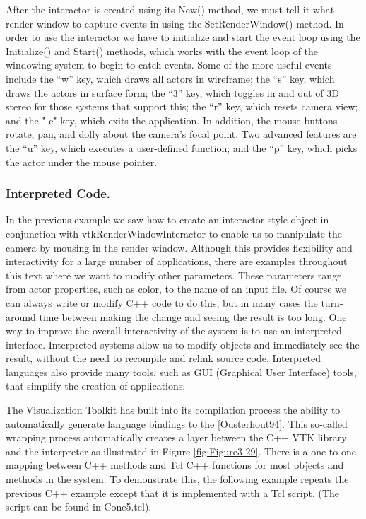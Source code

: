 After the interactor is created using its New() method, we must tell it what render window to capture events in using the SetRenderWindow() method. In order to use the interactor we have to initialize and start the event loop using the Initialize() and Start() methods, which works with the event loop of the windowing system to begin to catch events. Some of the more useful events include the ``w'' key, which draws all actors in wireframe; the ``s'' key, which draws the actors in surface form; the ``3'' key, which toggles in and out of 3D stereo for those systems that support this; the ``r'' key, which resets camera view; and the " e" key, which exits the application. In addition, the mouse buttons rotate, pan, and dolly about the camera's focal point. Two advanced features are the ``u'' key, which executes a user-defined function; and the ``p'' key, which picks the actor under the mouse pointer.

\subsubsection{Interpreted Code.}
\label{pg:ic}
In the previous example we saw how to create an interactor style object in conjunction with vtkRenderWindowInteractor to enable us to manipulate the camera by mousing in the render window. Although this provides flexibility and interactivity for a large number of applications, there are examples throughout this text where we want to modify other parameters. These parameters range from actor properties, such as color, to the name of an input file. Of course we can always write or modify C++ code to do this, but in many cases the turn-around time between making the change and seeing the result is too long. One way to improve the overall interactivity of the system is to use an interpreted interface. Interpreted systems allow us to modify objects and immediately see the result, without the need to recompile and relink source code. Interpreted languages also provide many tools, such as GUI (Graphical User Interface) tools, that simplify the creation of applications.

The Visualization Toolkit has built into its compilation process the ability to automatically generate language bindings to the [Ousterhout94]. This so-called wrapping process automatically creates a layer between the C++ VTK library and the interpreter as illustrated in Figure \ref{fig:Figure3-29}. There is a one-to-one mapping between C++ methods and Tcl C++ functions for most objects and methods in the system. To demonstrate this, the following example repeats the previous C++ example except that it is implemented with a Tcl script. (The script can be found in Cone5.tcl).

